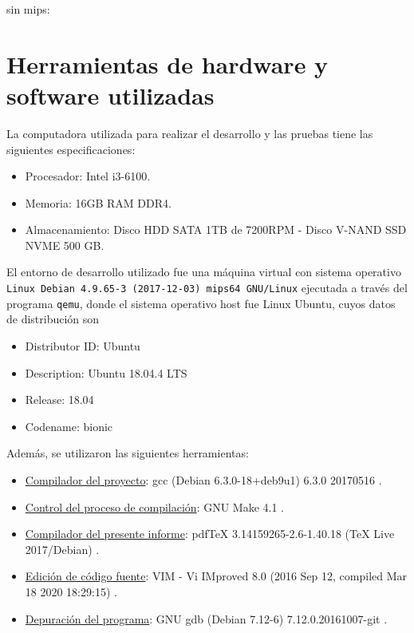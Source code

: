sin mips:

\section{Herramientas de hardware y software utilizadas}\label{sec_tools}

La computadora utilizada para realizar el desarrollo y las pruebas tiene las siguientes especificaciones:
\begin{itemize}
	\item Procesador: Intel i3-6100.
	\item Memoria: 16GB RAM DDR4.
	\item Almacenamiento: Disco HDD SATA 1TB de 7200RPM - Disco V-NAND SSD NVME 500 GB.
\end{itemize}

El entorno de desarrollo utilizado fue una máquina virtual con sistema operativo \texttt{Linux Debian 4.9.65-3 (2017-12-03) mips64 GNU/Linux} ejecutada a través del programa \texttt{qemu}, donde el sistema operativo host fue Linux Ubuntu, cuyos datos de distribución son
\begin{itemize}
	\item Distributor ID: Ubuntu
	\item Description: Ubuntu 18.04.4 LTS
	\item Release: 18.04
	\item Codename: bionic
\end{itemize}

Además, se utilizaron las siguientes herramientas:
\begin{itemize}
	\item \underline{Compilador del proyecto}: gcc (Debian 6.3.0-18+deb9u1) 6.3.0 20170516 \cite{tool_gcc}.
	\item \underline{Control del proceso de compilación}: GNU Make 4.1 \cite{tool_gnuMake}.
	\item \underline{Compilador del presente informe}: pdfTeX 3.14159265-2.6-1.40.18 (TeX Live 2017/Debian) \cite{tool_latex}.
    \item \underline{Edición de código fuente}: VIM - Vi IMproved 8.0 (2016 Sep 12, compiled Mar 18 2020 18:29:15) \cite{tool_vim}.
	\item \underline{Depuración del programa}: GNU gdb (Debian 7.12-6) 7.12.0.20161007-git \cite{tool_gdb}.
\end{itemize}

